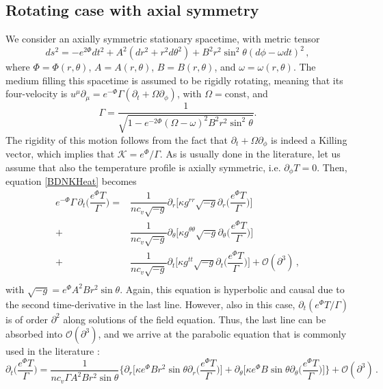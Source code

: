 \documentclass[a4paper, amsfonts, amssymb, amsmath, reprint, showkeys, nofootinbib, twoside, onecolumn,notitlepage]{revtex4-1}
\newcommand{\K}{{\mathcal{K}}}
\theoremstyle{definition}
\theoremstyle{theorem}
\begin{document}
\subsection{Rotating case with axial symmetry}

We consider an axially symmetric stationary spacetime, with metric tensor
\begin{equation}
ds^2 =-e^{2\Phi} dt^2 +A^2 (dr^2+r^2 d\theta^2) +B^2 r^2 \sin^2 \theta (d\phi-\omega dt)^2 \, ,
\end{equation}
where $\Phi=\Phi(r,\theta)$, $A=A(r,\theta)$, $B=B(r,\theta)$, and $\omega=\omega(r,\theta)$. The medium filling this spacetime is assumed to be rigidly rotating, meaning that its four-velocity is $u^\mu \partial_\mu =e^{-\Phi} \Gamma  (\partial_t +\Omega \partial_\phi)$, with $\Omega=\text{const}$, and
\begin{equation}
\Gamma = \dfrac{1}{\sqrt{1-e^{-2\Phi}(\Omega{-}\omega)^2 B^2 r^2\sin^2\theta}}.
\end{equation}
The rigidity of this motion follows from the fact that $\partial_t+\Omega\partial_\phi$ is indeed a Killing vector, which implies that $\K=e^{\Phi}/\Gamma$. As is usually done in the literature, let us assume that also the temperature profile is axially symmetric, i.e. $\partial_\phi T=0$. Then, equation \eqref{BDNKHeat} becomes
\begin{equation}
\begin{split}
e^{-\Phi} \Gamma \,  \partial_t\bigg(\dfrac{e^\Phi T}{\Gamma}\bigg)={}& \dfrac{1}{nc_v \sqrt{-g}} \partial_r \bigg[\kappa g^{rr} \sqrt{-g} \partial_r \bigg(\dfrac{e^\Phi T}{\Gamma}\bigg) \bigg] \\
+{}& \dfrac{1}{nc_v \sqrt{-g}} \partial_\theta \bigg[\kappa g^{\theta \theta} \sqrt{-g} \partial_\theta \bigg(\dfrac{e^\Phi T}{\Gamma}\bigg) \bigg] \\
+{}& \dfrac{1}{nc_v \sqrt{-g}} \partial_t \bigg[\kappa g^{tt} \sqrt{-g} \partial_t \bigg(\dfrac{e^\Phi T}{\Gamma}\bigg) \bigg] +\mathcal{O}(\partial^3) \, ,\\
\end{split}
\end{equation}
with $\sqrt{-g}=e^\Phi A^2 B r^2 \sin\theta$. Again, this equation is hyperbolic and causal due to the second time-derivative in the last line. However, also in this case, $\partial_t(e^\Phi T/\Gamma)$ is of order $\partial^2$ along solutions of the field equation. Thus, the last line can be absorbed into $\mathcal{O}(\partial^3)$, and we arrive at the parabolic equation that is commonly used in the literature \cite{Negreiros2012,Beznogov:2022wae}:
\begin{equation}
\partial_t\bigg(\dfrac{e^\Phi T}{\Gamma}\bigg)= \dfrac{1}{nc_v \Gamma A^2 B r^2 \sin\theta}\bigg\{ \partial_r \bigg[\kappa  e^\Phi B r^2 \sin\theta \partial_r \bigg(\dfrac{e^\Phi T}{\Gamma}\bigg) \bigg] +\partial_\theta \bigg[\kappa  e^\Phi  B  \sin\theta \partial_\theta \bigg(\dfrac{e^\Phi T}{\Gamma}\bigg) \bigg] \bigg\}  +\mathcal{O}(\partial^3)\, .
\end{equation}
\end{document}
